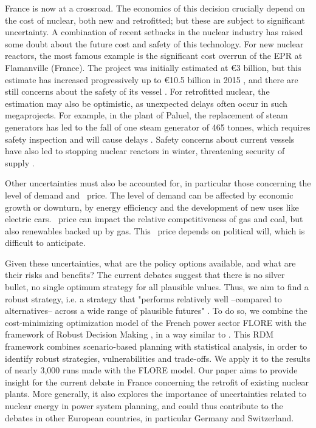 France is now at a crossroad. The economics of this decision crucially depend on the cost of nuclear, both new and retrofitted; but these are subject to significant uncertainty. A combination of recent setbacks in the nuclear industry has raised some doubt about the future cost and safety of this technology.
For new nuclear reactors, the most famous example is the significant cost overrun of the EPR at Flamanville (France). The project was initially estimated at \euro 3 billion, but this estimate has increased progressively up to \euro 10.5 billion in 2015 \citep{Garric2015}, and there are still concerns about the safety of its vessel \citep{Hir2015}. For retrofitted nuclear, the estimation may also be optimistic, as unexpected delays often occur in such megaprojects. For example, in the plant of Paluel, the replacement of steam generators has led to the fall of one steam generator of 465 tonnes, which requires safety inspection and will cause delays \citep{ASN2016}. Safety concerns about current vessels have also led to stopping nuclear reactors in winter, threatening security of supply \citep{Monicault2016}.

Other uncertainties must also be accounted for, in particular those concerning the level of demand and \coo\ price. The level of demand can be affected by economic growth or downturn, by energy efficiency and the development of new uses like electric cars. \coo\ price can impact the relative competitiveness of gas and coal, but also renewables backed up by gas. This \coo\ price depends on political will, which is difficult to anticipate.

Given these uncertainties, what are the policy options available, and what are their risks and benefits? 
The current debates suggest that there is no silver bullet, no single optimum strategy for all plausible values. Thus, we aim to find a robust strategy, i.e. a strategy that "performs relatively well --compared to alternatives-- across a wide range of plausible futures" \citep{Lempert2006}. 
To do so, we combine the cost-minimizing optimization model of the French power sector FLORE with the framework of Robust Decision Making \citep{Lempert2006}, in a way similar to \citet{Nahmmacher2016}. This RDM framework combines scenario-based planning with statistical analysis, in order to identify robust strategies, vulnerabilities and trade-offs. We apply it to the results of nearly 3,000 runs made with the FLORE model. 
Our paper aims to provide insight for the current debate in France concerning the retrofit of existing nuclear plants. More generally, it also explores the importance of uncertainties related to nuclear energy in power system planning, and could thus contribute to the debates in other European countries, in particular Germany and Switzerland.

